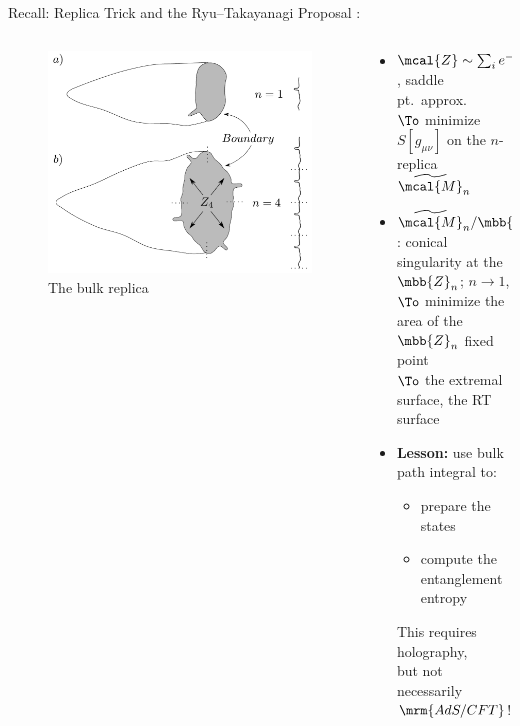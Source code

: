 \documentclass[aspectratio=169,10pt
	,noamsthm
]{beamer}
\begin{document}
\begin{frame}{Recall: Replica Trick and the Ryu--Takayanagi Proposal}{%
	\textcite{Lewkowycz:2013nqa}:\,%
}
	\begin{columns}
	\begin{column}{.425\textwidth}
		\begin{figure}[!h]
		\centering
		\includegraphics[width=\linewidth]{img/replica.png}
		\caption{The bulk replica \cite{Lewkowycz:2013nqa}}
		\end{figure}
	\end{column}
	\begin{column}{.55\textwidth}
		\begin{itemize}
		\item $\mcal{Z} \sim \sum_i e^{-S_i[g_{\mu\nu}]}$, saddle pt.\ approx.\\
			$\To$ minimize $S[g_{\mu\nu}]$ on the $n$-replica $\widetilde{\mcal{M}}_n$
		\item $\widetilde{\mcal{M}}_n/\mbb{Z}_n$: conical singularity at the $\mbb{Z}_n$; $n\to 1$,\\
			$\To$ minimize the area of the $\mbb{Z}_n$ fixed point\\
			$\To$ the extremal surface, the RT surface
		\\[2ex]
	\pause
		\item \textbf{Lesson:} use bulk path integral to:
			\begin{itemize}
			\item prepare the states
			\vspace{-1ex}
			\item compute the entanglement entropy
			\end{itemize}
			This requires holography, \\
			but not necessarily $\mrm{AdS/CFT}$!
		\end{itemize}
	\end{column}
	\end{columns}
\end{frame}
\end{document}
